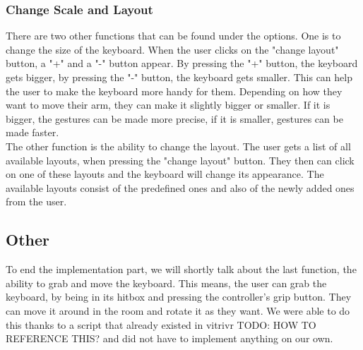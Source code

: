 \subsubsection{Change Scale and Layout}
There are two other functions that can be found under the options. One is to change the size of the keyboard. When the user clicks on the "change layout" button, a "+" and a "-" button appear. By pressing the "+" button, the keyboard gets bigger, by pressing the "-" button, the keyboard gets smaller. This can help the user to make the keyboard more handy for them. Depending on how they want to move their arm, they can make it slightly bigger or smaller. If it is bigger, the gestures can be made more precise, if it is smaller, gestures can be made faster.\\
The other function is the ability to change the layout. The user gets a list of all available layouts, when pressing the "change layout" button. They then can click on one of these layouts and the keyboard will change its appearance. The available layouts consist of the predefined ones and also of the newly added ones from the user.

\subsection{Other}
To end the implementation part, we will shortly talk about the last function, the ability to grab and move the keyboard. This means, the user can grab the keyboard, by being in its hitbox and pressing the controller's grip button. They can move it around in the room and rotate it as they want. We were able to do this thanks to a script that already existed in vitrivr TODO: HOW TO REFERENCE THIS? and did not have to implement anything on our own.
